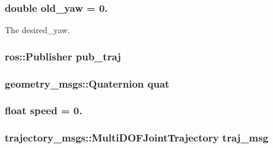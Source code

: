 \subsubsection[{\texorpdfstring{old\+\_\+yaw}{old_yaw}}]{\setlength{\rightskip}{0pt plus 5cm}double old\+\_\+yaw = 0.}\hypertarget{oculus-control-alternative_8cpp_a6f2a069eeaa873686f0991fe351fec51}{}\label{oculus-control-alternative_8cpp_a6f2a069eeaa873686f0991fe351fec51}


The desired\+\_\+yaw. 

\subsubsection[{\texorpdfstring{pub\+\_\+traj}{pub_traj}}]{\setlength{\rightskip}{0pt plus 5cm}ros\+::\+Publisher pub\+\_\+traj}\hypertarget{oculus-control-alternative_8cpp_a92b67ae724bc0d23b8e85e92e89403df}{}\label{oculus-control-alternative_8cpp_a92b67ae724bc0d23b8e85e92e89403df}
\subsubsection[{\texorpdfstring{quat}{quat}}]{\setlength{\rightskip}{0pt plus 5cm}geometry\+\_\+msgs\+::\+Quaternion quat}\hypertarget{oculus-control-alternative_8cpp_a71181c8a89676b15be113f74f57c9f23}{}\label{oculus-control-alternative_8cpp_a71181c8a89676b15be113f74f57c9f23}
\subsubsection[{\texorpdfstring{speed}{speed}}]{\setlength{\rightskip}{0pt plus 5cm}float speed = 0.}\hypertarget{oculus-control-alternative_8cpp_a7f7e4724cf57d59513b39c5ecc81adc8}{}\label{oculus-control-alternative_8cpp_a7f7e4724cf57d59513b39c5ecc81adc8}
\subsubsection[{\texorpdfstring{traj\+\_\+msg}{traj_msg}}]{\setlength{\rightskip}{0pt plus 5cm}trajectory\+\_\+msgs\+::\+Multi\+D\+O\+F\+Joint\+Trajectory traj\+\_\+msg}\hypertarget{oculus-control-alternative_8cpp_a090c0766fbb77862dd8cc0cca99d688b}{}\label{oculus-control-alternative_8cpp_a090c0766fbb77862dd8cc0cca99d688b}
